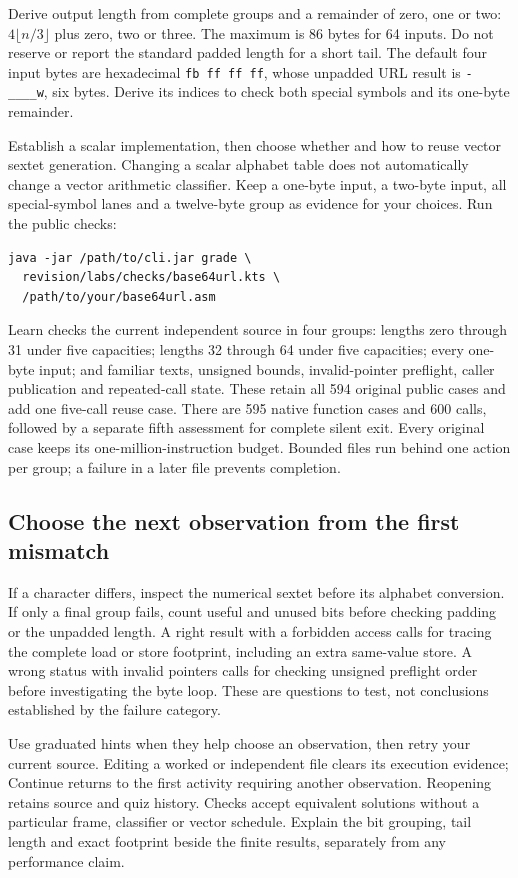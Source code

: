 Derive output length from complete groups and a remainder of zero, one or two:
$4\lfloor n/3\rfloor$ plus zero, two or three. The maximum is 86 bytes for
64 inputs. Do not reserve or report the standard padded length for a short tail.
The default four input bytes are hexadecimal \texttt{fb ff ff ff}, whose
unpadded URL result is \texttt{-\_\_\_\_w}, six bytes. Derive its indices to
check both special symbols and its one-byte remainder.

Establish a scalar implementation, then choose whether and how to reuse vector
sextet generation. Changing a scalar alphabet table does not automatically change
a vector arithmetic classifier. Keep a one-byte input, a two-byte input, all
special-symbol lanes and a twelve-byte group as evidence for your choices.
Run the public checks:
\begin{verbatim}
java -jar /path/to/cli.jar grade \
  revision/labs/checks/base64url.kts \
  /path/to/your/base64url.asm
\end{verbatim}
Learn checks the current independent source in four groups: lengths zero through
31 under five capacities; lengths 32 through 64 under five capacities; every
one-byte input; and familiar texts, unsigned bounds, invalid-pointer preflight,
caller publication and repeated-call state. These retain all 594 original public
cases and add one five-call reuse case. There are 595 native function cases and
600 calls, followed by a separate fifth assessment for complete silent exit.
Every original case keeps its one-million-instruction budget. Bounded files run
behind one action per group; a failure in a later file prevents completion.

\subsection*{Choose the next observation from the first mismatch}

If a character differs, inspect the numerical sextet before its alphabet
conversion. If only a final group fails, count useful and unused bits before
checking padding or the unpadded length. A right result with a forbidden access
calls for tracing the complete load or store footprint, including an extra
same-value store. A wrong status with invalid pointers calls for checking
unsigned preflight order before investigating the byte loop. These are questions
to test, not conclusions established by the failure category.

Use graduated hints when they help choose an observation, then retry your current
source. Editing a worked or independent file clears its execution evidence;
Continue returns to the first activity requiring another observation. Reopening
retains source and quiz history. Checks accept equivalent solutions without a
particular frame, classifier or vector schedule. Explain the bit grouping, tail
length and exact footprint beside the finite results, separately from any
performance claim.

